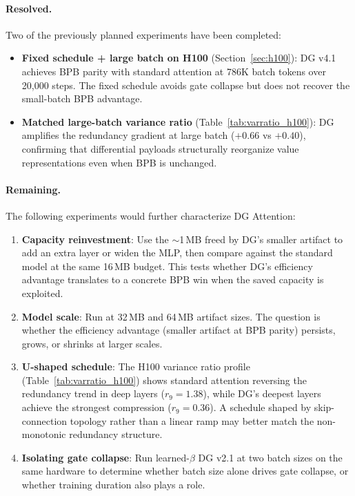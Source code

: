 \documentclass[11pt]{article}
\begin{document}
\paragraph{Resolved.} Two of the previously planned experiments have been completed:
\begin{itemize}
    \item \textbf{Fixed schedule + large batch on H100} (Section~\ref{sec:h100}): DG v4.1 achieves BPB parity with standard attention at 786K batch tokens over 20{,}000 steps. The fixed schedule avoids gate collapse but does not recover the small-batch BPB advantage.
    \item \textbf{Matched large-batch variance ratio} (Table~\ref{tab:varratio_h100}): DG amplifies the redundancy gradient at large batch ($+0.66$ vs $+0.40$), confirming that differential payloads structurally reorganize value representations even when BPB is unchanged.
\end{itemize}

\paragraph{Remaining.} The following experiments would further characterize DG Attention:
\begin{enumerate}
    \item \textbf{Capacity reinvestment}: Use the $\sim$1\,MB freed by DG's smaller artifact to add an extra layer or widen the MLP, then compare against the standard model at the same 16\,MB budget. This tests whether DG's efficiency advantage translates to a concrete BPB win when the saved capacity is exploited.
    \item \textbf{Model scale}: Run at 32\,MB and 64\,MB artifact sizes. The question is whether the efficiency advantage (smaller artifact at BPB parity) persists, grows, or shrinks at larger scales.
    \item \textbf{U-shaped schedule}: The H100 variance ratio profile (Table~\ref{tab:varratio_h100}) shows standard attention reversing the redundancy trend in deep layers ($r_9 = 1.38$), while DG's deepest layers achieve the strongest compression ($r_9 = 0.36$). A schedule shaped by skip-connection topology rather than a linear ramp may better match the non-monotonic redundancy structure.
    \item \textbf{Isolating gate collapse}: Run learned-$\beta$ DG v2.1 at two batch sizes on the same hardware to determine whether batch size alone drives gate collapse, or whether training duration also plays a role.
\end{enumerate}
\end{document}
